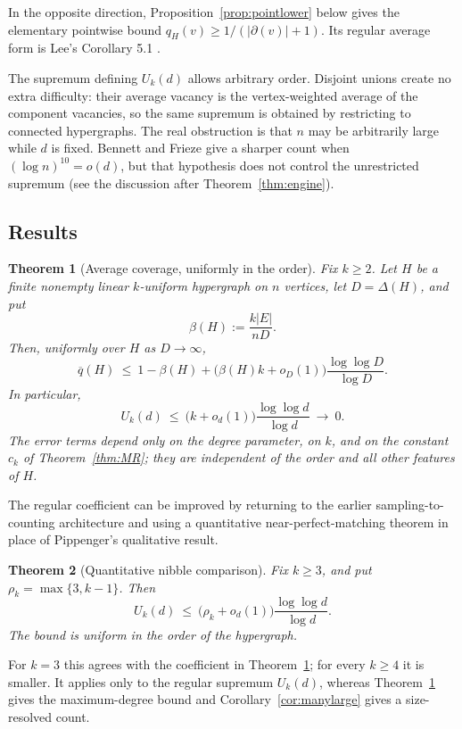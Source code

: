 \documentclass[11pt,a4paper]{amsart}
\theoremstyle{plain}
\newtheorem{theorem}{Theorem}[section]
\theoremstyle{definition}
\theoremstyle{remark}
\newcommand{\EE}{E}
\newcommand{\qbar}{\overline{q}}
\newcommand{\dg}{\partial}
\newcommand{\Deltaop}{\Delta}
\begin{document}
In the opposite direction, Proposition~\ref{prop:pointlower} below gives the elementary
pointwise bound $q_H(v)\ge1/(|\dg(v)|+1)$. Its regular average form is Lee's
Corollary 5.1 \cite[Corollary 5.1]{Lee}.

The supremum defining $U_k(d)$ allows arbitrary order. Disjoint unions create no extra
difficulty: their average vacancy is the vertex-weighted average of the component
vacancies, so the same supremum is obtained by restricting to connected hypergraphs. The
real obstruction is that $n$ may be arbitrarily large while $d$ is fixed. Bennett and
Frieze give a sharper count when $(\log n)^{10}=o(d)$, but that hypothesis does not control
the unrestricted supremum (see the discussion after Theorem~\ref{thm:engine}).

\subsection{Results}
\label{subsec:results}

\begin{theorem}[Average coverage, uniformly in the order]
\label{thm:main}
Fix $k\ge2$. Let $H$ be a finite nonempty linear $k$-uniform hypergraph on $n$ vertices,
let $D=\Deltaop(H)$, and put
\[
  \beta(H):=\frac{k|\EE|}{nD}.
\]
Then, uniformly over $H$ as $D\to\infty$,
\[
  \qbar(H)\ \le\ 1-\beta(H)
  +\bigl(\beta(H)k+o_D(1)\bigr)\frac{\log\log D}{\log D}.
\]
In particular,
\[
  U_k(d)\ \le\ \bigl(k+o_d(1)\bigr)\frac{\log\log d}{\log d}
  \ \longrightarrow\ 0.
\]
The error terms depend only on the degree parameter, on $k$, and on the constant $c_k$
of Theorem~\ref{thm:MR}; they are independent of the order and all other features of $H$.
\end{theorem}

The regular coefficient can be improved by returning to the earlier sampling-to-counting
architecture and using a quantitative near-perfect-matching theorem in place of
Pippenger's qualitative result.

\begin{theorem}[Quantitative nibble comparison]
\label{thm:nibble}
Fix $k\ge3$, and put $\rho_k=\max\{3,k-1\}$. Then
\[
  U_k(d)\ \le\ \bigl(\rho_k+o_d(1)\bigr)
  \frac{\log\log d}{\log d}.
\]
The bound is uniform in the order of the hypergraph.
\end{theorem}

For $k=3$ this agrees with the coefficient in Theorem~\ref{thm:main}; for every
$k\ge4$ it is smaller. It applies only to the regular supremum $U_k(d)$, whereas
Theorem~\ref{thm:main} gives the maximum-degree bound and Corollary~\ref{cor:manylarge}
gives a size-resolved count.
\end{document}
